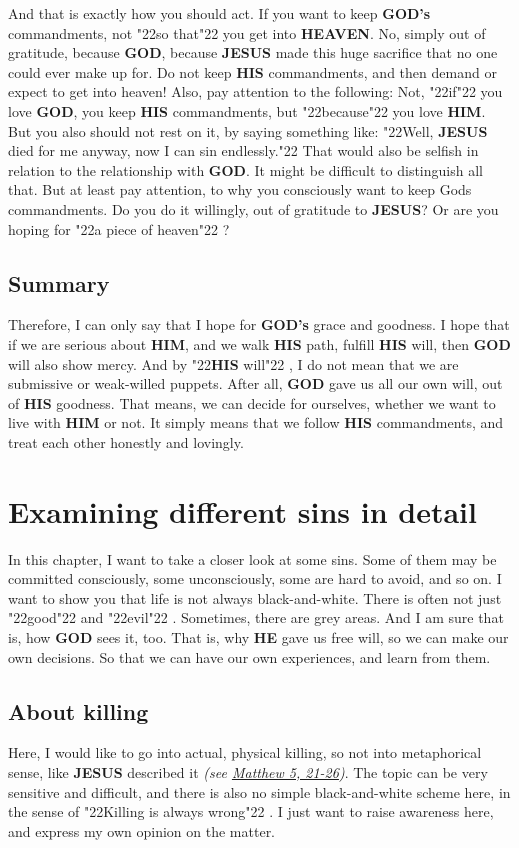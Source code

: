\documentclass[10pt,a5paper]{article}
\newcommand{\God}[0]{\textbf{GOD}}
\newcommand{\Gods}[0]{\textbf{GOD's}}
\newcommand{\He}[0]{\textbf{HE}}
\newcommand{\Heaven}[0]{\textbf{HEAVEN}}
\newcommand{\Him}[0]{\textbf{HIM}}
\newcommand{\His}[0]{\textbf{HIS}}
\newcommand{\Jesus}[0]{\textbf{JESUS}}
\newcommand{\q}[1]{\char"22{#1}\char"22 }
\begin{document}
		And that is exactly how you should act.
		If you want to keep {\Gods} commandments,
		not \q{so that} you get into {\Heaven}.
		No,
		simply out of gratitude,
		because {\God},
		because {\Jesus} made this huge sacrifice that no one could ever make up for.
		Do not keep {\His} commandments,
		and then demand or expect to get into heaven!
		Also,
		pay attention to the following:
		Not,
		\q{if} you love {\God},
		you keep {\His} commandments,
		but \q{because} you love {\Him}.
		But you also should not rest on it,
		by saying something like:
		\q{Well,
		{\Jesus} died for me anyway,
		now I can sin endlessly.}
		That would also be selfish in relation to the relationship with {\God}.
		It might be difficult to distinguish all that.
		But at least pay attention,
		to why you consciously want to keep {Gods} commandments.
		Do you do it willingly,
		out of gratitude to {\Jesus}?
		Or are you hoping for \q{a piece of heaven}?
		
	\subsection{Summary}
		Therefore,
		I can only say that I hope for {\Gods} grace and goodness.
		I hope that if we are serious about {\Him},
		and we walk {\His} path,
		fulfill {\His} will,
		then {\God} will also show mercy.
		And by \q{{\His} will},
		I do not mean that we are submissive or weak-willed puppets.
		After all,
		{\God} gave us all our own will,
		out of {\His} goodness.
		That means,
		we can decide for ourselves,
		whether we want to live with {\Him} or not.
		It simply means that we follow {\His} commandments,
		and treat each other honestly and lovingly.

	\newpage
	\section{Examining different sins in detail}
		In this chapter,
		I want to take a closer look at some sins.
		Some of them may be committed consciously,
		some unconsciously,
		some are hard to avoid,
		and so on.
		I want to show you that life is not always black-and-white.
		There is often not just \q{good} and \q{evil}.
		Sometimes,
		there are grey areas.
		And I am sure that is,
		how {\God} sees it,
		too.
		That is,
		why {\He} gave us free will,
		so we can make our own decisions.
		So that we can have our own experiences,
		and learn from them.
	
	\subsection{About killing}
		Here,
		I would like to go into actual,
		physical killing,
		so not into metaphorical sense,
		like {\Jesus} described it
		\textit{(see \href{https://www.die-bibel.de/bibeln/online-bibeln/lesen/ESV/MAT.5/Matthew-5}{Matthew 5, 21-26})}.
		The topic can be very sensitive and difficult,
		and there is also no simple black-and-white scheme here,
		in the sense of \q{Killing is always wrong}.
		I just want to raise awareness here,
		and express my own opinion on the matter.
\end{document}
